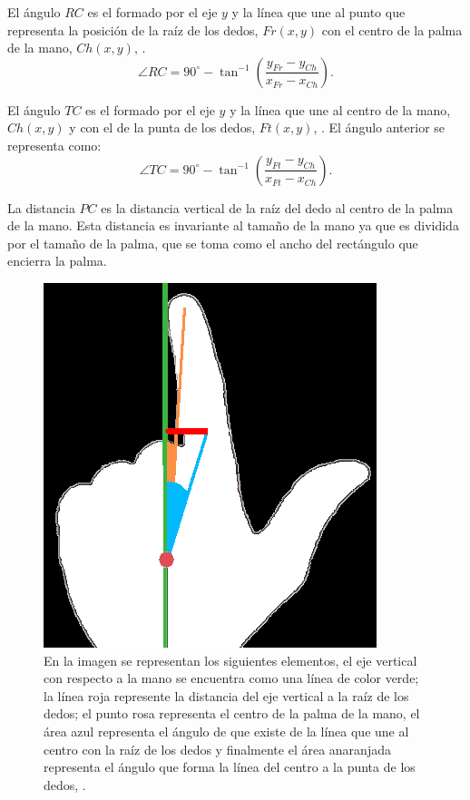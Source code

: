 El ángulo $RC$ es el formado por el eje $y$  y la línea que une al punto que representa la posición de la raíz de los dedos, $Fr(x,y)$ con el centro de la palma de la mano, $Ch(x,y)$, \citep{Sgouropoulos2014}. 
\begin{equation}
\angle RC = 90^\circ - \tan^{-1} \left( \frac{ y_{Fr}-y_{Ch} }{ x_{Fr}-x_{Ch} } \right).
\end{equation}


El ángulo $TC$ es el formado por el eje $y$ y la línea que une al centro de la mano, $Ch(x,y)$ y con el de la punta de los dedos, $Ft(x,y)$, \citep{Sgouropoulos2014}. El  ángulo anterior se representa como:
\begin{equation}
\angle TC = 90^\circ - \tan^{-1} \left( \frac{ y_{Ft}-y_{Ch} }{ x_{Ft}-x_{Ch} } \right).
\end{equation}
 

La distancia $PC$ es la distancia vertical de la raíz del dedo al centro de la palma de la mano. Esta distancia es invariante al tamaño de la mano ya que es dividida por el tamaño de la palma, que se toma como el ancho del rectángulo que encierra la palma.  

\begin{figure}[h!]
\begin{center}
\includegraphics[scale=.6]{./Figures/angles.png}
\end{center}
\caption{En la imagen se representan los siguientes elementos, el eje vertical con respecto a la mano se encuentra como una línea de color verde; la línea roja represente la distancia del eje vertical a la raíz de los dedos; el punto rosa representa el centro de la palma de la mano, el área azul representa el ángulo de que existe de la línea que une al centro con la raíz de los dedos y finalmente el área anaranjada representa el ángulo que forma la línea del centro a la punta de los dedos, \protect\citep{Sgouropoulos2014}.}
\label{fig:anglesFingers}
\end{figure} 


